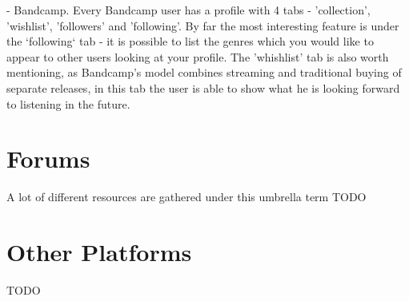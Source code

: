- Bandcamp.
Every Bandcamp user has a profile with 4 tabs - 'collection', 'wishlist', 'followers' and 'following'.
By far the most interesting feature is under the `following` tab - it is possible to list the genres
which you would like to appear to other users looking at your profile. The 'whishlist' tab is also worth mentioning,
as Bandcamp's model combines streaming and traditional buying of separate releases, in this tab the user is able to
show what he is looking forward to listening in the future.


\section{Forums}
A lot of different resources are gathered under this umbrella term
TODO


\section{Other Platforms}
TODO